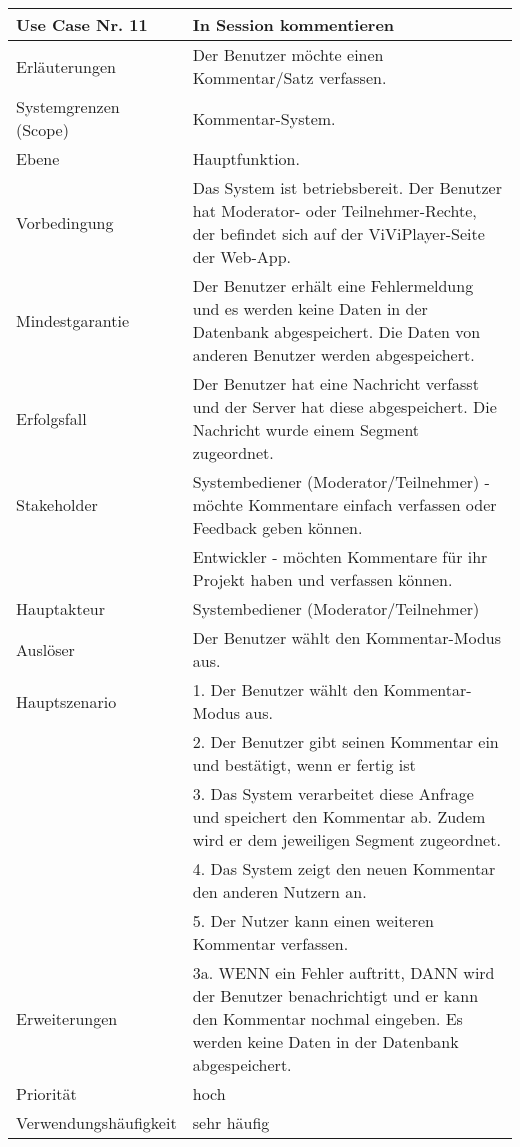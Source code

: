 \begin{tabularx}{\linewidth}{|l|X|}
	\hline
	Use Case Nr. 11			& \textbf{In Session kommentieren} \\ \hline
	Erläuterungen			& Der Benutzer möchte einen Kommentar/Satz verfassen. \\ \hline
	Systemgrenzen (Scope)	& Kommentar-System. \\ \hline
	Ebene					& Hauptfunktion. \\ \hline
	Vorbedingung			& Das System ist betriebsbereit. Der Benutzer hat Moderator- oder 
							  Teilnehmer-Rechte, der befindet sich auf der ViViPlayer-Seite der Web-App. \\ \hline
	Mindestgarantie			& Der Benutzer erhält eine Fehlermeldung und es werden keine Daten 
							  in der Datenbank abgespeichert. Die Daten von anderen Benutzer werden abgespeichert. \\ \hline
	Erfolgsfall				& Der Benutzer hat eine Nachricht verfasst und der Server hat 
							  diese abgespeichert. Die Nachricht wurde einem Segment zugeordnet.\\ \hline
	Stakeholder				& Systembediener (Moderator/Teilnehmer) - möchte Kommentare einfach 
							  verfassen oder Feedback geben können.\\ 
                            & Entwickler - möchten Kommentare für ihr Projekt haben und 
                              verfassen können. \\ \hline
	Hauptakteur				& Systembediener (Moderator/Teilnehmer) \\ \hline
	Auslöser				& Der Benutzer wählt den Kommentar-Modus aus. \\ \hline	
	Hauptszenario			& 1. Der Benutzer wählt den Kommentar-Modus aus. \\
                            & 2. Der Benutzer gibt seinen Kommentar ein und bestätigt, wenn er 
                              fertig ist\\
							& 3. Das System verarbeitet diese Anfrage und speichert den 
							  Kommentar ab. Zudem wird er dem jeweiligen Segment zugeordnet. \\
							& 4. Das System zeigt den neuen Kommentar den anderen Nutzern an.\\
							& 5. Der Nutzer kann einen weiteren Kommentar verfassen. \\ \hline
	Erweiterungen			& 3a. WENN ein Fehler auftritt, DANN wird der Benutzer 
							  benachrichtigt und er kann den Kommentar nochmal eingeben. Es werden keine Daten in der Datenbank abgespeichert.\\ \hline
	Priorität				& hoch \\ \hline
	Verwendungshäufigkeit	& sehr häufig \\ \hline
\end{tabularx}
